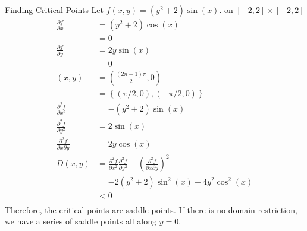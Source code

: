 \documentclass[8pt]{extarticle}
\begin{document}
  \begin{problem}{Finding Critical Points}
    Let $f(x,y) = (y^2 + 2)\sin(x)$. on $[-2,2] \times [-2,2]$
    \begin{align*}
      \frac{\partial f}{\partial x} &= (y^2 + 2)\cos(x)\\
                                    &= 0\\
      \frac{\partial f}{\partial y} &= 2y\sin(x)\\
                                    &= 0\\
      (x,y) &= \left(\frac{\left(2n+1\right)\pi}{2},0\right)\\
            &= \left\{(\pi/2,0),(-\pi/2,0)\right\}\\
      \frac{\partial^2f}{\partial x^2} &= -(y^2 + 2)\sin(x)\\
      \frac{\partial^2f}{\partial y^2} &= 2\sin(x)\\
      \frac{\partial^2f}{\partial x \partial y} &= 2y\cos(x)\\
      D(x,y) &= \frac{\partial^2f}{\partial x^2}\frac{\partial^2f}{\partial y^2} - \left(\frac{\partial^2f}{\partial x \partial y}\right)^2\\
             &= -2(y^2 + 2)\sin^2(x) - 4y^2\cos^2(x)\\
             &< 0\\
    \end{align*}
    Therefore, the critical points are saddle points. If there is no domain restriction, we have a series of saddle points all along $y=0$.
  \end{problem}
\end{document}
